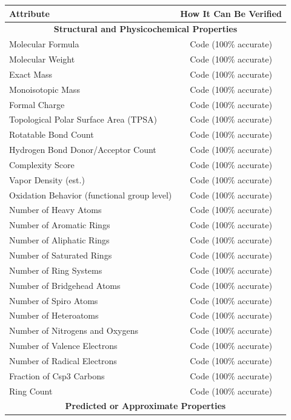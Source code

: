 \documentclass[10pt]{article} %
\begin{document}
\begin{table}[ht]
\centering
\begin{tabular}{|l|c|}
\hline
\textbf{Attribute} & \textbf{How It Can Be Verified} \\
\hline
\multicolumn{2}{|c|}{\textbf{Structural and Physicochemical Properties}} \\
\hline
Molecular Formula & Code (100\% accurate) \\
Molecular Weight & Code (100\% accurate) \\
Exact Mass & Code (100\% accurate) \\
Monoisotopic Mass & Code (100\% accurate) \\
Formal Charge & Code (100\% accurate) \\
Topological Polar Surface Area (TPSA) & Code (100\% accurate) \\
Rotatable Bond Count & Code (100\% accurate) \\
Hydrogen Bond Donor/Acceptor Count & Code (100\% accurate) \\
Complexity Score & Code (100\% accurate) \\
Vapor Density (est.) & Code (100\% accurate) \\
Oxidation Behavior (functional group level) & Code (100\% accurate) \\
Number of Heavy Atoms & Code (100\% accurate) \\
Number of Aromatic Rings & Code (100\% accurate) \\
Number of Aliphatic Rings & Code (100\% accurate) \\
Number of Saturated Rings & Code (100\% accurate) \\
Number of Ring Systems & Code (100\% accurate) \\
Number of Bridgehead Atoms & Code (100\% accurate) \\
Number of Spiro Atoms & Code (100\% accurate) \\
Number of Heteroatoms & Code (100\% accurate) \\
Number of Nitrogens and Oxygens & Code (100\% accurate) \\
Number of Valence Electrons & Code (100\% accurate) \\
Number of Radical Electrons & Code (100\% accurate) \\
Fraction of Csp3 Carbons & Code (100\% accurate) \\
Ring Count & Code (100\% accurate) \\
\hline
\multicolumn{2}{|c|}{\textbf{Predicted or Approximate Properties}} \\

\end{tabular}
\end{table}
\end{document}
